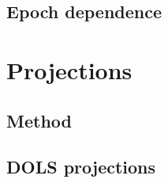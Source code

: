 \documentclass[11pt]{article}
\begin{document}
\subsection{Epoch dependence}
%
%


\section{Projections}

\subsection{Method}
%
%
%

\subsection{DOLS projections}
%
%
\end{document}
